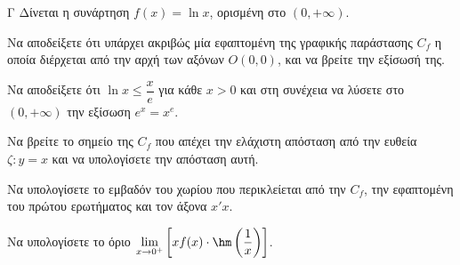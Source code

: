 \begin{thema}{Γ}
Δίνεται η συνάρτηση $f(x) = \ln x$, ορισμένη στο $(0, +\infty)$.
\begin{erwthma}
  \item Να αποδείξετε ότι υπάρχει ακριβώς μία εφαπτομένη της γραφικής παράστασης $C_f$ η οποία διέρχεται από την αρχή των αξόνων $O(0, 0)$, και να βρείτε την εξίσωσή της.
  \item Να αποδείξετε ότι $\ln x \le \dfrac{x}{e}$ για κάθε $x > 0$ και στη συνέχεια να λύσετε στο $(0, +\infty)$ την εξίσωση $e^x = x^e$.
  \item Να βρείτε το σημείο της $C_f$ που απέχει την ελάχιστη απόσταση από την ευθεία $\zeta: y = x$ και να υπολογίσετε την απόσταση αυτή.
  \item Να υπολογίσετε το εμβαδόν του χωρίου που περικλείεται από την $C_f$, την εφαπτομένη του πρώτου ερωτήματος και τον άξονα $x'x$.
  \item Να υπολογίσετε το όριο $\lim\limits_{x \to 0^+} \left[ x f(x) \cdot \hm\left(\dfrac{1}{x}\right) \right]$.
\end{erwthma}
\end{thema}
